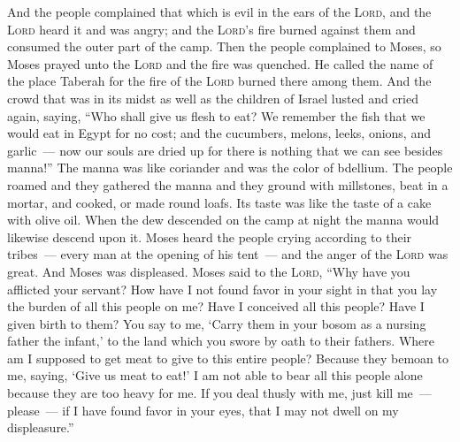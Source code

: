 
\begin{inparaenum}
     And the people complained that which is evil in the ears of the \textsc{Lord}, and the \textsc{Lord} heard it and was angry; and the \textsc{Lord}'s fire burned against them and consumed the outer part of the camp.%
     Then the people complained to Moses, so Moses prayed unto the \textsc{Lord} and the fire was quenched.%
     He called the name of the place Taberah for the fire of the \textsc{Lord} burned there among them.%
     And the crowd that was in its midst as well as the children of Israel lusted and cried again, saying, ``Who shall give us flesh to eat?%
     We remember the fish that we would eat in Egypt for no cost; and the cucumbers, melons, leeks, onions, and garlic~---%
     now our souls are dried up for there is nothing that we can see besides manna!''%
     The manna was like coriander and was the color of bdellium.%
     The people roamed and they gathered the manna and they ground with millstones, beat in a mortar, and cooked, or made round loafs. Its taste was like the taste of a cake with olive oil.%
     When the dew descended on the camp at night the manna would likewise descend upon it.%
     Moses heard the people crying according to their tribes~--- every man at the opening of his tent~--- and the anger of the \textsc{Lord} was great. And Moses was displeased.%
     Moses said to the \textsc{Lord}, ``Why have you afflicted your servant? How have I not found favor in your sight in that you lay the burden of all this people on me?%
     Have I conceived all this people? Have I given birth to them? You say to me, `Carry them in your bosom as a nursing father the infant,' to the land which you swore by oath to their fathers.%
     Where am I supposed to get meat to give to this entire people? Because they bemoan to me, saying, `Give us meat to eat!'%
     I am not able to bear all this people alone because they are too heavy for me.%
     If you deal thusly with me, just kill me~--- please~--- if I have found favor in your eyes, that I may not dwell on my displeasure.''%
    

\end{inparaenum}
